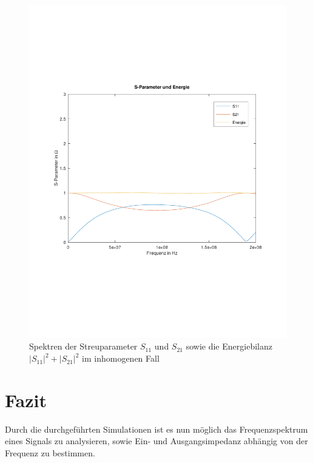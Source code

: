 \documentclass[Protokollheft.tex]{subfiles}
\begin{document}
\begin{figure}
	\centering
	\includegraphics[trim = 15mm 65mm 15mm 65mm, clip,width=0.7\linewidth]{inhomo_5}
	\caption{Spektren der Streuparameter $S_{11}$ und $S_{21}$ sowie die Energiebilanz $|S_{11}|^2 + |S_{21}|^2$ im inhomogenen Fall}
	\label{fig:inhomo_5}
\end{figure}

\section{Fazit}
Durch die durchgeführten Simulationen ist es nun möglich das Frequenzspektrum eines Signals zu analysieren, sowie Ein- und Ausgangsimpedanz abhängig von der Frequenz zu bestimmen.
\end{document}
